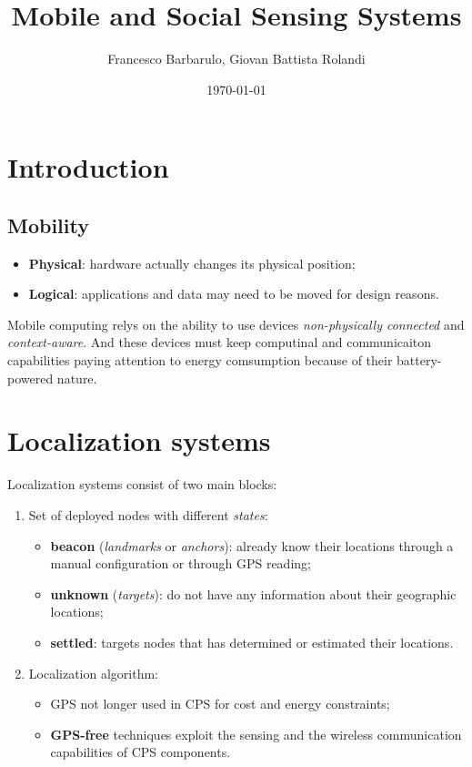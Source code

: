 \documentclass[a4paper,12pt]{article}
\title{Mobile and Social Sensing Systems}
\author{Francesco Barbarulo, Giovan Battista Rolandi}
\date{\monthyeardate\today}
\begin{document}

\maketitle
{}

\tableofcontents

\newpage


\section{Introduction}
\subsection{Mobility}
\begin{itemize}
    \item \textbf{Physical}: hardware actually changes its physical position;
    \item \textbf{Logical}: applications and data may need to be moved for design reasons.
\end{itemize}

Mobile computing relys on the ability to use devices \textit{non-physically connected} and \textit{context-aware}. And these devices must keep computinal and communicaiton capabilities paying attention to energy comsumption because of their battery-powered nature.

\section{Localization systems}
Localization systems consist of two main blocks:
\begin{enumerate}[label=(\roman*)]
	\item Set of deployed nodes with different \textit{states}:
		\begin{itemize}
		 	\item \textbf{beacon} (\textit{landmarks} or \textit{anchors}): already know their locations through a manual configuration or through GPS reading;
		  	\item \textbf{unknown} (\textit{targets}): do not have any information about their geographic locations;
		  	\item \textbf{settled}: targets nodes that has determined or estimated their locations.
		\end{itemize}
	\item Localization algorithm:
		\begin{itemize}
			\item GPS not longer used in CPS for cost and energy constraints;
			\item \textbf{GPS-free} techniques exploit the sensing and the wireless communication capabilities of CPS components.
		\end{itemize}
\end{enumerate}
\end{document}
